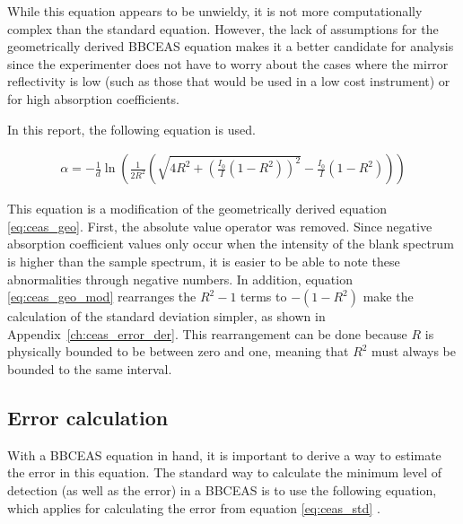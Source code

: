 While this equation appears to be unwieldy, it is not more computationally
complex than the standard equation. However, the lack of assumptions for the
geometrically derived \ac{BBCEAS} equation makes it a better candidate for
analysis since the experimenter does not have to worry about the cases where
the mirror reflectivity is low (such as those that would be used in a low cost
instrument) or for high absorption coefficients.

In this report, the following equation is used.


\begin{align}
    \alpha = -\frac{1}{d}\ln\left(\frac{1}{2R^2}\left(\sqrt{4R^2+\left(\frac{I_0}{I}(1-R^2)\right)^2} - \frac{I_0}{I}(1-R^2)\right)\right) \label{eq:ceas_geo_mod}
\end{align}

This equation is a modification of the geometrically derived equation
\eqref{eq:ceas_geo}. First, the absolute value operator was removed. Since
negative absorption coefficient values only occur when the intensity of
the blank spectrum is higher than the sample spectrum, it is easier to be
able to note these abnormalities through negative numbers. In addition,
equation \eqref{eq:ceas_geo_mod} rearranges the $R^2-1$ terms to $-(1-R^2)$
make the calculation of the standard deviation simpler, as shown in
Appendix~\ref{ch:ceas_error_der}. This rearrangement can be done because $R$
is physically bounded to be between zero and one, meaning that $R^2$ must
always be bounded to the same interval.



\subsection{Error calculation}\label{subsec:ceas_error}


With a \ac{BBCEAS} equation in hand, it is important to derive a way to
estimate the error in this equation. The standard way to calculate the minimum
level of detection (as well as the error) in a \ac{BBCEAS} is to use the
following equation, which applies for calculating the error from equation
\eqref{eq:ceas_std} \cite{Mazurenka:2005fh}.


